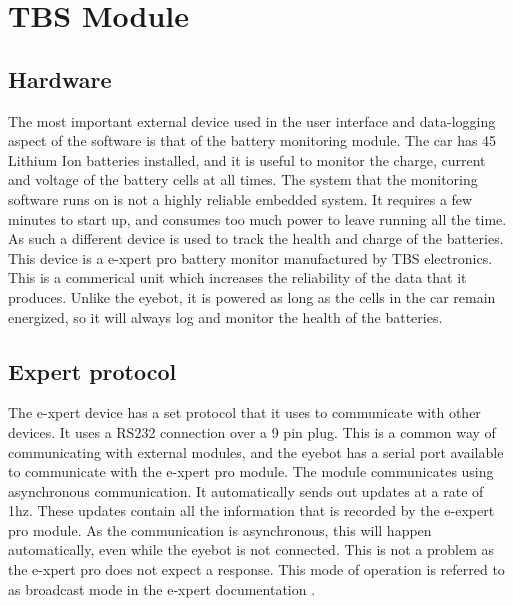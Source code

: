 

\section{TBS Module}

\subsection{Hardware}

The most important external device used in the user interface and data-logging aspect of the software is that of the battery monitoring module. The car has 45 Lithium Ion batteries installed, and it is useful to monitor the charge, current and voltage of the battery cells at all times. The system that the monitoring software runs on is not a highly reliable embedded system. It requires a few minutes to start up, and consumes too much power to leave running all the time. As such a different device is used to track the health and charge of the batteries. This device is a e-xpert pro battery monitor manufactured by TBS electronics. This is a commerical unit which increases the reliability of the data that it produces. Unlike the eyebot,  it is powered as long as the cells in the car remain energized, so it will always log and monitor the health of the batteries.

\subsection{E\-xpert protocol}

The e-xpert device has a set protocol that it uses to communicate with other devices. It uses a RS232 connection over a 9 pin plug. This is a common way of communicating with external modules, and the eyebot has a serial port available to communicate with the e-xpert pro module. The module communicates using asynchronous communication. It automatically sends out updates at a rate of 1hz\cite{e_xpert}. These updates contain all the information that is recorded by the e-expert pro module. As the communication is asynchronous, this will happen automatically, even while the eyebot is not connected. This is not a problem as the e-xpert pro does not expect a response. This mode of operation is referred to as broadcast mode in the e-xpert documentation \cite{e_xpert}.

